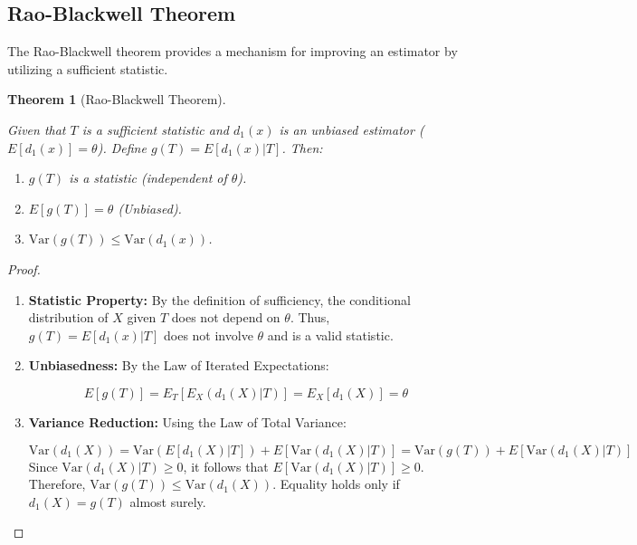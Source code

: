 \documentclass[
  letterpaper,
  DIV=11,
  numbers=noendperiod]{scrreprt}
\providecommand{\tightlist}{%
  \setlength{\itemsep}{0pt}\setlength{\parskip}{0pt}}
\renewcommand{\[}{\begin{equation}}
\renewcommand{\]}{\end{equation}}
\theoremstyle{definition}
\theoremstyle{plain}
\theoremstyle{plain}
\theoremstyle{plain}
\newtheorem{theorem}{Theorem}[chapter]
\theoremstyle{definition}
\theoremstyle{plain}
\theoremstyle{remark}
\begin{document}
\subsection{Rao-Blackwell Theorem}\label{rao-blackwell-theorem}

The Rao-Blackwell theorem provides a mechanism for improving an
estimator by utilizing a sufficient statistic.

\begin{theorem}[Rao-Blackwell
Theorem]\protect\hypertarget{thm-rao-blackwell}{}\label{thm-rao-blackwell}

Given that \(T\) is a sufficient statistic and \(d_1(x)\) is an unbiased
estimator (\(E[d_1(x)] = \theta\)). Define \(g(T) = E[d_1(x) | T]\).
Then:

\begin{enumerate}
\def\labelenumi{\arabic{enumi}.}
\tightlist
\item
  \(g(T)\) is a statistic (independent of \(\theta\)).
\item
  \(E[g(T)] = \theta\) (Unbiased).
\item
  \(\text{Var}(g(T)) \le \text{Var}(d_1(x))\).
\end{enumerate}

\end{theorem}

\begin{proof}
\leavevmode

\begin{enumerate}
\def\labelenumi{\arabic{enumi}.}
\item
  \textbf{Statistic Property:} By the definition of sufficiency, the
  conditional distribution of \(X\) given \(T\) does not depend on
  \(\theta\). Thus, \(g(T) = E[d_1(x)|T]\) does not involve \(\theta\)
  and is a valid statistic.
\item
  \textbf{Unbiasedness:} By the Law of Iterated Expectations:

  \[E[g(T)] = E_T[ E_X(d_1(X)|T) ] = E_X[d_1(X)] = \theta\]
\item
  \textbf{Variance Reduction:} Using the Law of Total Variance:

  \[\text{Var}(d_1(X)) = \text{Var}(E[d_1(X)|T]) + E[\text{Var}(d_1(X)|T)] = \text{Var}(g(T)) + E[\text{Var}(d_1(X)|T)]\]
  Since \(\text{Var}(d_1(X)|T) \ge 0\), it follows that
  \(E[\text{Var}(d_1(X)|T)] \ge 0\). Therefore,
  \(\text{Var}(g(T)) \le \text{Var}(d_1(X))\). Equality holds only if
  \(d_1(X) = g(T)\) almost surely.
\end{enumerate}

\end{proof}
\end{document}
